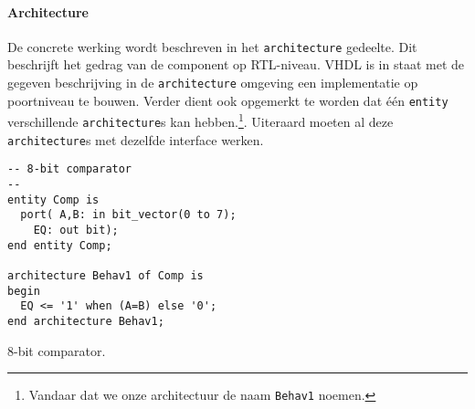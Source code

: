\paragraph{Architecture}
De concrete werking wordt beschreven in het \texttt{architecture} gedeelte. Dit beschrijft het gedrag van de component op RTL-niveau. VHDL is in staat met de gegeven beschrijving in de \texttt{architecture} omgeving een implementatie op poortniveau te bouwen. Verder dient ook opgemerkt te worden dat \'e\'en \texttt{entity} verschillende \texttt{architecture}s kan hebben.\footnote{Vandaar dat we onze architectuur de naam \texttt{Behav1} noemen.}. Uiteraard moeten al deze \texttt{architecture}s met dezelfde interface werken.
\begin{vhdlcode}
\centering
\begin{lstlisting}
-- 8-bit comparator
--
entity Comp is
  port(	A,B: in bit_vector(0 to 7);
	EQ: out bit);
end entity Comp;

architecture Behav1 of Comp is
begin
  EQ <= '1' when (A=B) else '0';
end architecture Behav1;
\end{lstlisting}
\caption{8-bit comparator.}
\label{vhdl:comp}
\end{vhdlcode}
